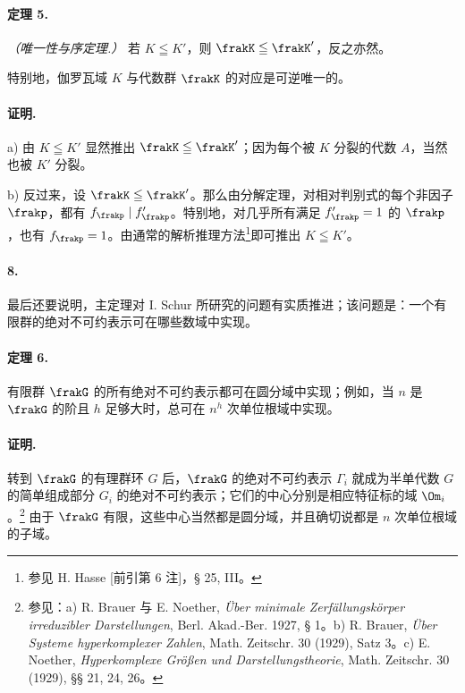 \paragraph{定理 5.}
\emph{（唯一性与序定理.）} 若 \(K\leqq K'\)，则 \(\frakK\leqq\frakK'\)，反之亦然。

特别地，伽罗瓦域 \(K\) 与代数群 \(\frakK\) 的对应是可逆唯一的。

\paragraph{证明.}
a) 由 \(K\leqq K'\) 显然推出 \(\frakK\leqq\frakK'\)；因为每个被 \(K\) 分裂的代数 \(A\)，当然也被 \(K'\) 分裂。

b) 反过来，设 \(\frakK\leqq\frakK'\)。那么由分解定理，对相对判别式的每个非因子 \(\frakp\)，都有 \(f_{\frakp}\mid f'_{\frakp}\)。特别地，对几乎所有满足 \(f'_{\frakp}=1\) 的 \(\frakp\)，也有 \(f_{\frakp}=1\)。由通常的解析推理方法\footnote{参见 H. Hasse [前引第 6 注]，§ 25, III。}即可推出 \(K\leqq K'\)。

\paragraph{8.}
最后还要说明，主定理对 I. Schur 所研究的问题有实质推进；该问题是：一个有限群的绝对不可约表示可在哪些数域中实现。

\paragraph{定理 6.}
有限群 \(\frakG\) 的所有绝对不可约表示都可在圆分域中实现；例如，当 \(n\) 是 \(\frakG\) 的阶且 \(h\) 足够大时，总可在 \(n^h\) 次单位根域中实现。

\paragraph{证明.}
转到 \(\frakG\) 的有理群环 \(G\) 后，\(\frakG\) 的绝对不可约表示 \(\Gamma_i\) 就成为半单代数 \(G\) 的简单组成部分 \(G_i\) 的绝对不可约表示；它们的中心分别是相应特征标的域 \(\Om_i\)。\footnote{参见：a) R. Brauer 与 E. Noether, \emph{Über minimale Zerfällungskörper irreduzibler Darstellungen}, Berl. Akad.-Ber. 1927, § 1。b) R. Brauer, \emph{Über Systeme hyperkomplexer Zahlen}, Math. Zeitschr. 30 (1929), Satz 3。c) E. Noether, \emph{Hyperkomplexe Größen und Darstellungstheorie}, Math. Zeitschr. 30 (1929), §§ 21, 24, 26。} 由于 \(\frakG\) 有限，这些中心当然都是圆分域，并且确切说都是 \(n\) 次单位根域的子域。

